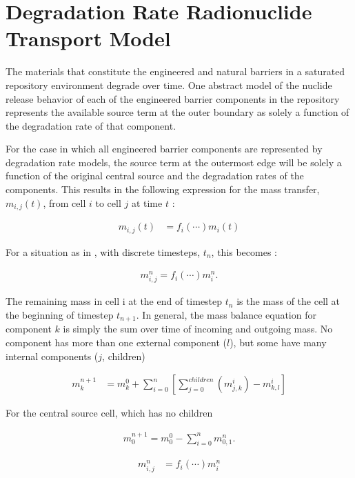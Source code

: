 \section{Degradation Rate Radionuclide Transport Model}\label{sec:deg_rate}

The materials that constitute the engineered and natural barriers in a saturated 
repository environment degrade over time. One abstract model of the nuclide 
release behavior of each of the engineered barrier components in the repository 
represents the available source term at the outer boundary as solely a 
function of the degradation rate of that component.

For the case in which all engineered barrier components are represented by 
degradation rate models, the source term at the outermost edge will be solely
a function of the original central source and the degradation rates of the 
components. This results in the following expression for the mass transfer, 
$m_{i,j}(t)$, from cell $i$ to cell $j$ at time $t$ :

\begin{align}
m_{i,j}(t) &= f_i(\cdots)m_i(t)
\label{deg_rate}
\end{align}

For a situation as in \Cyclus, with discrete timesteps, $t_n$, this becomes :

\begin{align}
m_{i,j}^n = f_i(\cdots)m_i^n.
\label{discrete}
\end{align}

The remaining mass in cell i at the end of timestep $t_n$ is the mass of the 
cell at the beginning of timestep $t_{n+1}$. In general, the mass balance 
equation for component $k$ is simply the sum over time of incoming and outgoing 
mass. No component has more than one external component ($l$), but some have 
many internal components ($j$, children)

\begin{align}
m_k^{n+1} &= m_k^0 + \sum_{i=0}^n\left[ \sum_{j=0}^{children}\left( m_{j,k}^i\right) - m_{k,l}^i\right]
\label{deg_rate}
\end{align}

For the central source cell, which has no children

\begin{align}
m_0^{n+1} = m_0^0 - \sum_{i=0}^n m_{0,1}^n.
\label{source}
\end{align}



\begin{align}
m_{i,j}^n &= f_i(\cdots)m_i^n
\label{deg_rate}
\end{align}
